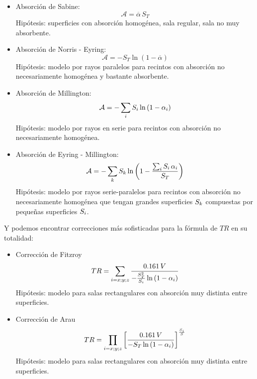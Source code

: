 \documentclass[a5paper,12pt,twoside]{book}
\begin{document}
\begin{itemize}
    \item
    Absorción de Sabine:
    \begin{equation*}
        \mathcal{A} = \overline{\alpha} \, S_T
    \end{equation*}
    Hipótesis: superficies con absorción homogénea, sala regular, sala no muy absorbente.
    
    \item
    Absorción de Norris - Eyring:
    \begin{equation*}
        \mathcal{A} = - S_T \ln \left(1-\overline{\alpha}\right)
    \end{equation*}
    Hipótesis: modelo por rayos paralelos para recintos con absorción no necesariamente homogénea y bastante absorbente.
    
    \item
    Absorción de Millington:
    \begin{equation*}
        \mathcal{A} = -\sum_i S_i \ln \left( 1-\alpha_i \right)
    \end{equation*}
    Hipótesis: modelo por rayos en serie para recintos con absorción no necesariamente homogénea.
    
    \item
    Absorción de Eyring - Millington:
    \begin{equation*}
        \mathcal{A} = - \sum_k S_k \ln \left( 1-\frac{\sum_i S_i \, \alpha_i}{S_T} \right)
    \end{equation*}
    Hipótesis: modelo por rayos serie-paralelos para recintos con absorción no necesariamente homogénea que tengan grandes superficies $S_k$ compuestas por pequeñas superficies $S_i$.
\end{itemize}

Y podemos encontrar correcciones más sofisticadas para la fórmula de $TR$ en su totalidad:

\begin{itemize}
    \item
    Corrección de Fitzroy
    \begin{equation*}
        TR = \sum_{i=x;y;z} \frac{0.161 \, V}{-\frac{S_T^2}{S_i} \ln \left(1-\alpha_i\right)}
    \end{equation*}
    Hipótesis: modelo para salas rectangulares con absorción muy distinta entre superficies.
    
    \item
    Corrección de Arau
    \begin{equation*}
        TR = \prod_{i=x;y;z} \left[ \frac{0.161 \, V}{-S_T \ln \left(1-\alpha_i\right)} \right]^\frac{S_i}{S}
    \end{equation*}
    Hipótesis: modelo para salas rectangulares con absorción muy distinta entre superficies.
\end{itemize}
\end{document}
